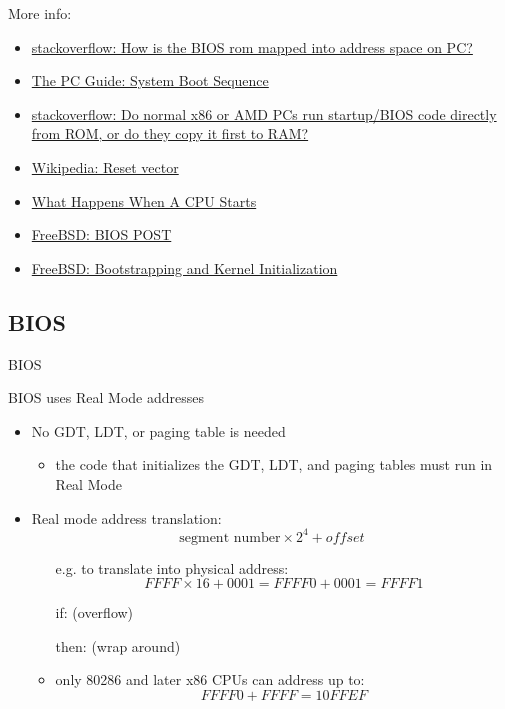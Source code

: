 More info:
\begin{itemize}
\item
  \href{http://stackoverflow.com/questions/7804724/how-is-the-bios-rom-mapped-into-address-space-on-pc}{stackoverflow:
    How is the BIOS rom mapped into address space on PC?}
\item \href{http://www.pcguide.com/ref/mbsys/bios/bootSequence-c.html}{The PC Guide: System
    Boot Sequence}
\item
  \href{http://stackoverflow.com/questions/5300527/do-normal-x86-or-amd-pcs-run-startup-bios-code-directly-from-rom-or-do-they-cop}{stackoverflow:
    Do normal x86 or AMD PCs run startup/BIOS code directly from ROM, or do they copy it
    first to RAM?}
\item \href{http://en.wikipedia.org/wiki/Reset_vector}{Wikipedia: Reset vector}
\item \href{http://lateblt.tripod.com/bit68.txt}{What Happens When A CPU Starts}
\item \href{http://www.freebsd.org/doc/en/books/arch-handbook/boot-bios.html}{FreeBSD:
    BIOS POST}
\item \href{http://www.freebsd.org/doc/en/books/arch-handbook/boot.html}{FreeBSD:
    Bootstrapping and Kernel Initialization}
\end{itemize}

\subsection{BIOS}
\label{sec:bios}

\begin{frame}{BIOS}
  \begin{block}{BIOS uses Real Mode addresses}
    \begin{itemize}
    \item No GDT, LDT, or paging table is needed
      \begin{itemize}
      \item the code that initializes the GDT, LDT, and paging tables must run in Real Mode
      \end{itemize}
    \item Real mode address translation:
      $$\text{segment number}\times{}2^4+offset$$
      \begin{itemize}
      \item[e.g.] to translate  into physical address:
        $$FFFF \times{} 16 + 0001 = FFFF0 + 0001 = FFFF1$$
      \item[if:]  (overflow)
      \item[then:]  (wrap around)
      \item only 80286 and later x86 CPUs can address up to:
        $$FFFF0 + FFFF = 10FFEF$$
      \end{itemize}
    \end{itemize}
  \end{block}
\end{frame}

